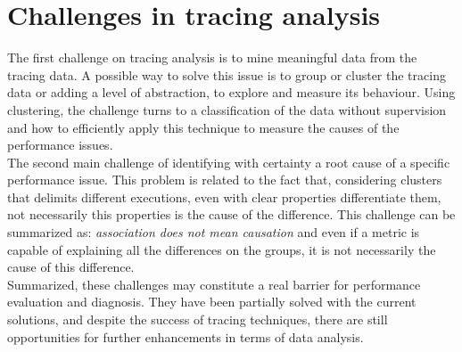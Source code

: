 \section{Challenges in tracing analysis}  %
The first challenge on tracing analysis is to mine meaningful data from the tracing data. A possible way to solve this issue is to group or cluster the tracing data or adding a level of abstraction, to explore and measure its behaviour. Using clustering, the challenge turns to a classification of the data without supervision and how to efficiently apply this technique to measure the causes of the performance issues.\\
The second main challenge of identifying with certainty a root cause of a specific performance issue. This problem is related to the fact that, considering clusters that delimits different executions, even with clear properties differentiate them, not necessarily this properties is the cause of the difference. This challenge can be summarized as: \textit{association does not mean causation} and even if a metric is capable of explaining all the differences on the groups, it is not necessarily the cause of this difference.\\
Summarized, these challenges may constitute a real barrier for performance evaluation and diagnosis. They have been partially solved with the current solutions, and despite the success of tracing techniques, there are still opportunities for further enhancements in terms of data analysis.

